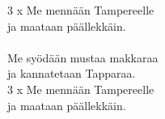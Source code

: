 
3 x Me mennään Tampereelle \\ ja maataan päällekkäin. \\ \hspace{10mm} \\ Me syödään mustaa makkaraa \\ ja kannatetaan Tapparaa. \\ 3 x Me mennään Tampereelle \\ ja maataan päällekkäin.